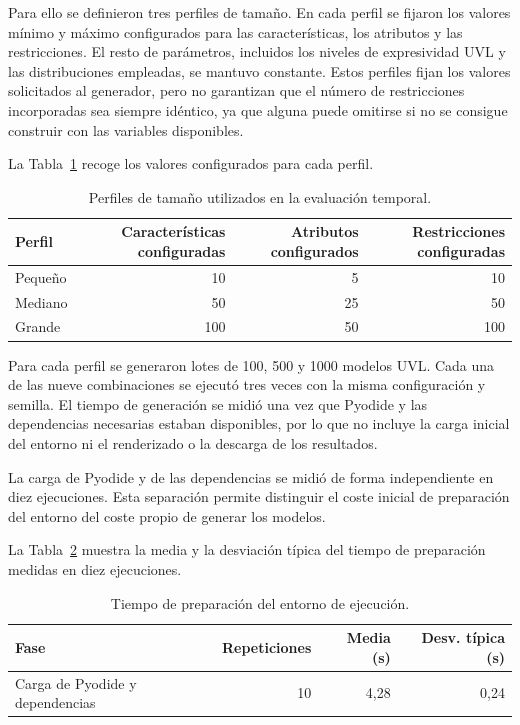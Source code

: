 Para ello se definieron tres perfiles de tamaño. En cada perfil se fijaron los
valores mínimo y máximo configurados para las características, los atributos y
las restricciones. El resto de parámetros, incluidos los niveles de
expresividad UVL y las distribuciones empleadas, se mantuvo constante. Estos
perfiles fijan los valores solicitados al generador, pero no garantizan que el
número de restricciones incorporadas sea siempre idéntico, ya que alguna
puede omitirse si no se consigue construir con las variables disponibles.

La Tabla~\ref{tab:perfiles-o4} recoge los valores configurados para cada
perfil.

\begin{table}[H]
\centering
\small
\renewcommand{\arraystretch}{1.2}
\begin{tabular}{lrrr}
\toprule
\textbf{Perfil} & \textbf{Características configuradas} &
\textbf{Atributos configurados} & \textbf{Restricciones configuradas} \\
\midrule
Pequeño & 10  & 5  & 10  \\
Mediano & 50  & 25 & 50  \\
Grande   & 100 & 50 & 100 \\
\bottomrule
\end{tabular}
\caption{Perfiles de tamaño utilizados en la evaluación temporal.}
\label{tab:perfiles-o4}
\end{table}

Para cada perfil se generaron lotes de 100, 500 y 1000 modelos UVL. Cada una
de las nueve combinaciones se ejecutó tres veces con la misma configuración y
semilla. El tiempo de generación se midió una vez que Pyodide y las
dependencias necesarias estaban disponibles, por lo que no incluye la carga
inicial del entorno ni el renderizado o la descarga de los resultados.

La carga de Pyodide y de las dependencias se midió de forma independiente en
diez ejecuciones. Esta separación permite distinguir el coste inicial de
preparación del entorno del coste propio de generar los modelos.

La Tabla~\ref{tab:carga-pyodide-o4} muestra la media y la desviación
típica del tiempo de preparación medidas en diez ejecuciones.

\begin{table}[H]
\centering
\small
\renewcommand{\arraystretch}{1.2}
\begin{tabular}{lrrr}
\toprule
\textbf{Fase} & \textbf{Repeticiones} & \textbf{Media (s)} &
\textbf{Desv. típica (s)} \\
\midrule
Carga de Pyodide y dependencias & 10 & 4,28 & 0,24 \\
\bottomrule
\end{tabular}
\caption{Tiempo de preparación del entorno de ejecución.}
\label{tab:carga-pyodide-o4}
\end{table}

